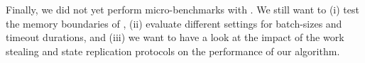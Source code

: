  Finally, we did not yet perform micro-benchmarks with \dodo{}.
  We still want to
  (i) test the memory boundaries of \dodo{},
  (ii) evaluate different settings for batch-sizes and timeout durations, and
  (iii) we want to have a look at the impact of the work stealing and state replication protocols on the performance of our algorithm.


